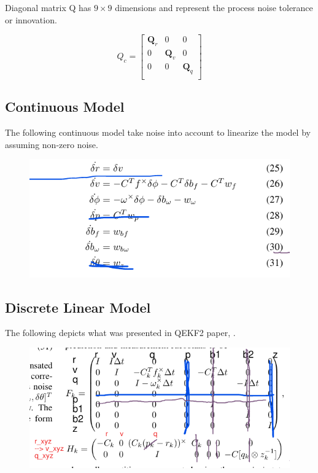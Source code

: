 \documentclass[letterpaper, 10 pt, conference]{ieeeconf}  %
\begin{document}
Diagonal matrix Q has \( 9 \times 9 \) dimensions and represent the process
noise tolerance or innovation.

\begin{equation}
Q_{c} =
  \begin{bmatrix}
    \mathbf{Q}_{r} & 0 & 0 \\
    0 & \mathbf{Q}_{v} & 0 \\
    0 & 0 & \mathbf{Q}_{q} \\
  \end{bmatrix}
\end{equation}



\subsection{Continuous Model}
The following continuous model take noise into account to linearize the model
by assuming non-zero noise.

\begin{figure}[h]
        \includegraphics[width=.45\textwidth]{fig03_contModel.png}
        \centering
\end{figure}

\subsection{Discrete Linear Model}
The following depicts what was presented in QEKF2 paper, \cite{rotella2014state}.

\begin{figure}[h]
        \includegraphics[width=.45\textwidth]{fig02_ldm.png}
        \centering
\end{figure}
\end{document}
